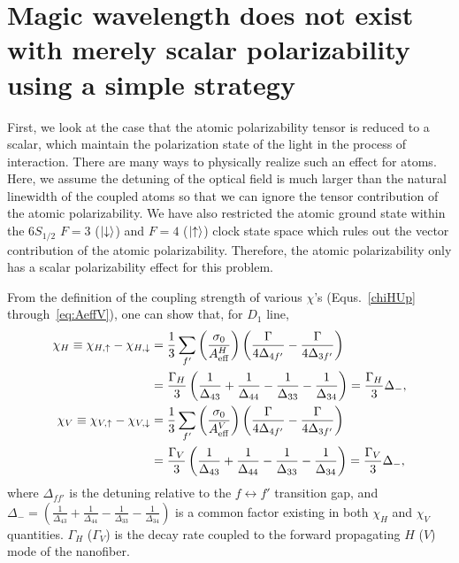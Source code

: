 \section{Magic wavelength does not exist with merely scalar polarizability using a simple strategy}
First, we look at the case that the atomic polarizability tensor is reduced to a scalar, which maintain the polarization state of the light in the process of interaction. There are many ways to physically realize such an effect for atoms. 
Here, we assume the detuning of the optical field is much larger than the natural linewidth of the 
coupled atoms so that we can ignore the tensor contribution of the atomic polarizability. We have also 
restricted the atomic ground state within the $ 6S_{1/2} $ $ F=3 $ ($ \lvert{\downarrow}\rangle $) and $ F=4 $ ($ 
\lvert{\uparrow}\rangle $) clock state space which rules out the vector contribution of 
the atomic polarizability. Therefore, the atomic polarizability only has a scalar polarizability effect for this problem. 

From the definition of the coupling strength of various $ \chi $'s (Equs.~\eqref{chiHUp} through~\eqref{eq:AeffV}), one can show that, for $ D_1 $ line, 
\begin{align}
\chi_H \equiv \chi_{H,\uparrow} - \chi_{H,\downarrow} &= \frac{1}{3}\sum_{f'} \left(\frac{\sigma_0}{A_{\rm eff}^H} \right) \left(\frac{\Gamma}{4\Delta_{4f'}} - \frac{\Gamma}{4\Delta_{3f'}} \right) \nonumber\\
&= \frac{\Gamma_H}{3} \left(\frac{1}{\Delta_{43}}+\frac{1}{\Delta_{44}} - \frac{1}{\Delta_{33}}-\frac{1}{\Delta_{34}} \right) = \frac{\Gamma_H}{3}\Delta_-,\label{eq:chiH}\\
\chi_V \equiv \chi_{V,\uparrow} - \chi_{V,\downarrow} &= \frac{1}{3}\sum_{f'} \left(\frac{\sigma_0}{A_{\rm eff}^V} \right) \left(\frac{\Gamma}{4\Delta_{4f'}} - \frac{\Gamma}{4\Delta_{3f'}} \right) \nonumber\\
&= \frac{\Gamma_V}{3} \left(\frac{1}{\Delta_{43}}+\frac{1}{\Delta_{44}} - \frac{1}{\Delta_{33}}-\frac{1}{\Delta_{34}} \right)=\frac{\Gamma_V}{3}\Delta_-,\label{eq:chiV}
\end{align}
where $ \Delta_{ff'} $ is the detuning relative to the $ f\leftrightarrow f' $ transition gap, and $ \Delta_- = \left(\frac{1}{\Delta_{43}}+\frac{1}{\Delta_{44}} - \frac{1}{\Delta_{33}}-\frac{1}{\Delta_{34}} \right) $ is a common factor existing in both $ \chi_H $ and $ \chi_V $ quantities. $ \Gamma_H $ ($ \Gamma_V $) is the decay rate coupled to the forward propagating $ H $ ($ V $) mode of the nanofiber. 

